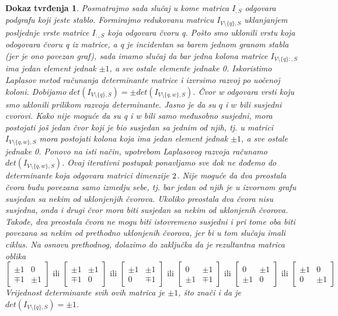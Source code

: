 \documentclass[11pt]{article}
\newtheorem*{custom_proof}{Dokaz tvrđenja}
\begin{document}
\begin{custom_proof}
		Posmatrajmo sada slučaj u kome matrica $I_{,S}$ odgovara podgrafu koji jeste stablo. Formirajmo redukovanu matricu $I_{V \setminus \{q\},S}$ uklanjanjem posljednje vrste matrice $I_{:,S}$ koja odgovara čvoru q. 
	    Pošto smo uklonili vrstu koja odogovara čvoru q iz matrice, a q je incidentan sa barem jednom granom stabla (jer je ono povezan graf), sada imamo slučaj da bar jedna kolona matrice $I_{V \setminus \{q\}:,S}$
		ima jedan element jednak $\pm 1$, a sve ostale elemente jednake 0. Iskoristimo Laplasov metod računanja determinante matrice i izvrsimo razvoj po uočenoj koloni.
		Dobijamo $det(I_{V \setminus \{q\},S}) = \pm det(I_{V \setminus \{q,w\},S})$. Čvor w odgovara vrsti koju smo uklonili prilikom razvoja determinante.
		Jasno je da su $q$ i $w$ bili susjedni cvorovi. 
		Kako nije moguće da su q i w bili samo međusobno susjedni, mora postojati još jedan čvor koji je bio susjedan sa jednim od njih, tj. u matrici $I_{V \setminus \{q,w\},S}$ mora postojati kolona koja ima jedan element
		jednak $\pm 1$, a sve ostale jednake 0. Ponovo na isti način, upotrebom Laplasovog razvoja računamo $det(I_{V \setminus \{q,w\},S})$. 
		Ovaj iterativni postupak ponavljamo sve dok ne dođemo do determinante koja odgovara matrici dimenzije $2 \time 2$. 
		Nije moguće da dva preostala čvora budu povezana samo izmedju sebe, tj. bar jedan od njih je u izvornom grafu susjedan sa nekim od uklonjenjih čvorova.
		Ukoliko preostala dva čvora nisu susjedna, onda i drugi čvor mora biti susjedan sa nekim od uklonjenih čvorova.
		Takođe, dva preostala čvora ne mogu biti istovremeno susjedni i pri tome oba biti povezana sa nekim od prethodno uklonjenih čvorova, jer bi u tom slučaju imali ciklus.
		Na osnovu prethodnog, dolazimo do zaključka da je rezultantna matrica oblika 
		\[
		\begin{bmatrix} \pm 1 &  0 \\ \mp 1 & \pm 1 \end{bmatrix}
		\text{ ili } \begin{bmatrix} \pm 1 &  \pm 1 \\ \mp 1 & 0 \end{bmatrix}
		\text{ ili } \begin{bmatrix} \pm 1 &  \pm 1 \\ 0 &  \mp 1 \end{bmatrix}
		\text{ ili } \begin{bmatrix} 0 & \pm 1 \\ \pm 1 & \mp 1 \end{bmatrix}
		\text{ ili } \begin{bmatrix} 0 &  \pm 1 \\ \pm 1 & 0 \end{bmatrix}
		\text{ ili } \begin{bmatrix} \pm 1 &  0 \\ 0 & \pm 1 \end{bmatrix}
		\] 
		Vrijednost determinante svih ovih matrica je $\pm 1$, 
		što znači i da je $det(I_{V \setminus \{q\},S}) = \pm 1$.
	

\end{custom_proof}
\end{document}
